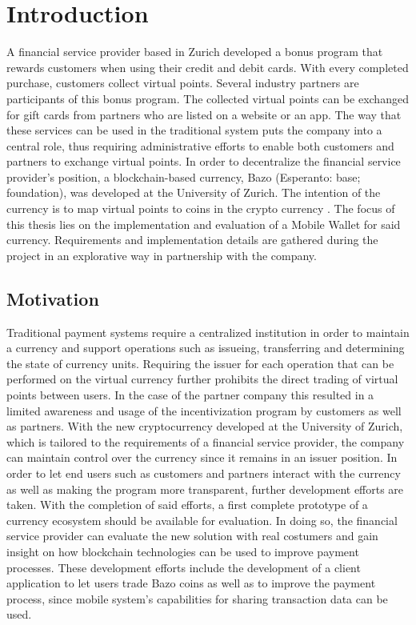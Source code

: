 \chapter{Introduction}

A financial service provider based in Zurich developed a bonus program that rewards customers when using their credit and debit cards. With every completed purchase, customers collect virtual points. Several industry partners are participants of this bonus program. The collected virtual points can be exchanged for gift cards from partners who are listed on a website or an app. The way that these services can be used in the traditional system puts the company into a central role, thus requiring administrative efforts to enable both customers and partners to exchange virtual points. In order to decentralize the financial service provider's position, a blockchain-based currency, Bazo (Esperanto: base; foundation), was developed at the University of Zurich. The intention of the currency is to map virtual points to coins in the crypto currency \cite{lisg}.
The focus of this thesis lies on the implementation and evaluation of a Mobile Wallet for said currency. Requirements and implementation details are gathered during the project in an explorative way in partnership with the company.
\section{Motivation}
Traditional payment systems require a centralized institution in order to maintain a currency and support operations such as issueing, transferring and determining the state of currency units. Requiring the issuer for each operation that can be performed on the virtual currency further prohibits the direct trading of virtual points between users.
In the case of the partner company this resulted in a limited awareness and usage of the incentivization program by customers as well as partners.
With the new cryptocurrency developed at the University of Zurich, which is tailored to the requirements of a financial service provider, the company can maintain control over the currency since it remains in an issuer position. In order to let end users such as customers and partners interact with the currency as well as making the program more transparent, further development efforts are taken. With the completion of said efforts, a first complete prototype of a currency ecosystem should be available for evaluation. In doing so, the financial service provider can evaluate the new solution with real costumers and gain insight on how blockchain technologies can be used to improve payment processes. These development efforts include the development of a client application to let users trade Bazo coins as well as to improve the payment process, since mobile system's capabilities for sharing transaction data can be used.
